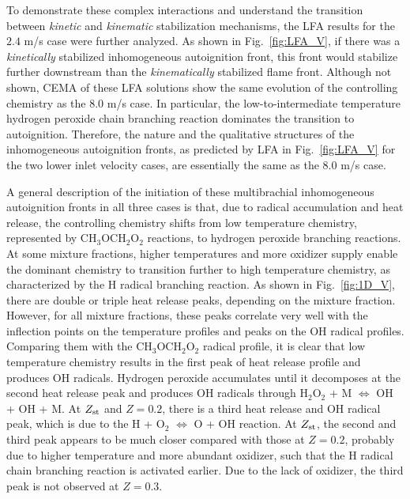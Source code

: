 \documentclass[review,3p,times]{elsarticle}
\begin{document}
To demonstrate these complex interactions and understand the transition between \emph{kinetic} and \emph{kinematic} stabilization mechanisms, the LFA results for the $2.4$ m/s case were further analyzed.  As shown in Fig.~\ref{fig:LFA_V}, if there was a \emph{kinetically} stabilized inhomogeneous autoignition front, this front would stabilize further downstream than the \emph{kinematically} stabilized flame front.  Although not shown, CEMA of these LFA solutions show the same evolution of the controlling chemistry as the $8.0$ m/s case.  In particular, the low-to-intermediate temperature hydrogen peroxide chain branching reaction dominates the transition to autoignition.  Therefore, the nature and the qualitative structures of the inhomogeneous autoignition fronts, as predicted by LFA in Fig.~\ref{fig:LFA_V} for the two lower inlet velocity cases, are essentially the same as the $8.0$ m/s case.  

A general description of the initiation of these multibrachial inhomogeneous autoignition fronts in all three cases is that, due to radical accumulation and heat release, the controlling chemistry shifts from low temperature chemistry, represented by CH$_3$OCH$_2$O$_2$ reactions, to hydrogen peroxide branching reactions.  At some mixture fractions, higher temperatures and more oxidizer supply enable the dominant chemistry to transition further to high temperature chemistry, as characterized by the H radical branching reaction.  As shown in Fig.~\ref{fig:1D_V}, there are double or triple heat release peaks, depending on the mixture fraction.  However, for all mixture fractions, these peaks correlate very well with the inflection points on the temperature profiles and peaks on the OH radical profiles.  Comparing them with the CH$_3$OCH$_2$O$_2$ radical profile, it is clear that low temperature chemistry results in the first peak of heat release profile and produces OH radicals.  Hydrogen peroxide accumulates until it decomposes at the second heat release peak and produces OH radicals through H$_2$O$_2$ + M $\Longleftrightarrow$ OH + OH + M.  At $Z_{\rm st}$ and $Z = 0.2$, there is a third heat release and OH radical peak, which is due to the H + O$_2$ $\Longleftrightarrow$ O + OH reaction.  At $Z_{\rm st}$, the second and third peak appears to be much closer compared with those at $Z = 0.2$, probably due to higher temperature and more abundant oxidizer, such that the H radical chain branching reaction is activated earlier.  Due to the lack of oxidizer, the third peak is not observed at $Z = 0.3$.  
\end{document}
